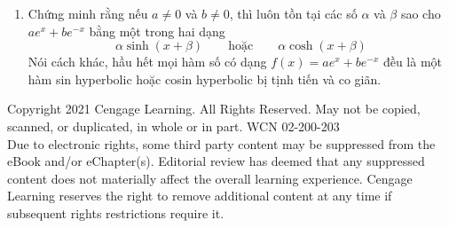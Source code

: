 \begin{minipage}[t]{0.482\textwidth}
\begin{enumerate}[label=\textbf{\arabic*.}, leftmargin=*, itemsep=8.5pt, topsep=0pt, parsep=0pt]
\[\item Nếu $x = \ln(\sec\theta + \tan\theta)$, hãy chứng minh rằng $\sec\theta = \cosh x$.

\item Tại điểm nào trên đường cong $y = \cosh x$ thì tiếp tuyến có hệ số góc bằng 1?

\casitem Khảo sát họ hàm số
\[
f_n(x) = \tanh(n\sin x)
\]
trong đó $n$ là một số nguyên dương. Hãy mô tả điều gì xảy ra với đồ thị của $f_n$ khi $n$ trở nên rất lớn.

\item Chứng minh rằng nếu $a \neq 0$ và $b \neq 0$, thì luôn tồn tại các số $\alpha$ và $\beta$ sao cho $ae^x + be^{-x}$ bằng một trong hai dạng
\[
\alpha\sinh(x + \beta) \qquad \text{hoặc} \qquad \alpha\cosh(x + \beta)
\]
Nói cách khác, hầu hết mọi hàm số có dạng $f(x) = ae^x + be^{-x}$ đều là một hàm sin hyperbolic hoặc cosin hyperbolic bị tịnh tiến và co giãn.

\end{enumerate}
\end{minipage}

\vfill
\begin{center}
{\fontsize{5.2pt}{6.5pt}\selectfont\color{footergray}
Copyright 2021 Cengage Learning. All Rights Reserved. May not be copied, scanned, or duplicated, in whole or in part. WCN 02-200-203\\
Due to electronic rights, some third party content may be suppressed from the eBook and/or eChapter(s). Editorial review has deemed that any suppressed content does not materially affect the overall learning experience. Cengage Learning reserves the right to remove additional content at any time if subsequent rights restrictions require it.}
\end{center}
